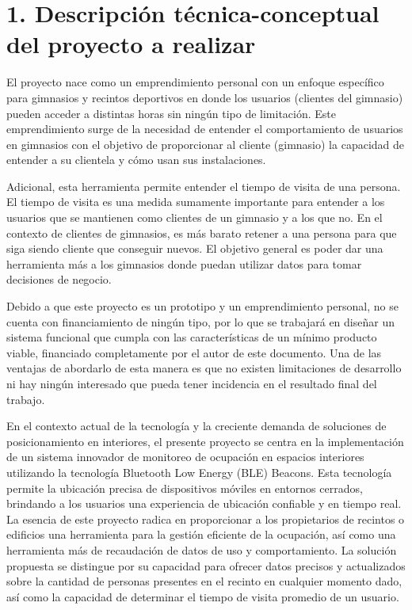 \documentclass[
11pt, %
]{charter}
\begin{document}
\section{1. Descripción técnica-conceptual del proyecto a realizar}
\label{sec:descripcion}

\setlength{\parindent}{1cm}El proyecto nace como un emprendimiento personal con un enfoque específico para gimnasios y recintos deportivos en donde los usuarios (clientes del gimnasio) pueden acceder a distintas horas sin ningún tipo de limitación. Este emprendimiento surge de la necesidad de entender el comportamiento de usuarios en gimnasios con el objetivo de proporcionar al cliente (gimnasio) la capacidad de entender a su clientela y cómo usan sus instalaciones. 

\setlength{\parindent}{1cm}Adicional, esta herramienta permite entender el tiempo de visita de una persona. El tiempo de visita es una medida sumamente importante para entender a los usuarios que se mantienen como clientes de un gimnasio y a los que no. En el contexto de clientes de gimnasios, es más barato retener a una persona para que siga siendo cliente que conseguir nuevos. El objetivo general es poder dar una herramienta más a los gimnasios donde puedan utilizar datos para tomar decisiones de negocio.

\setlength{\parindent}{1cm}Debido a que este proyecto es un prototipo y un emprendimiento personal, no se cuenta con financiamiento de ningún tipo, por lo que se trabajará en diseñar un sistema funcional que cumpla con las características de un mínimo producto viable, financiado completamente por el autor de este documento. Una de las ventajas de abordarlo de esta manera es que no existen limitaciones de desarrollo ni hay ningún interesado que pueda tener incidencia en el resultado final del trabajo.

\setlength{\parindent}{1cm}En el contexto actual de la tecnología y la creciente demanda de soluciones de posicionamiento en interiores, el presente proyecto se centra en la implementación de un sistema innovador de monitoreo de ocupación en espacios interiores utilizando la tecnología Bluetooth Low Energy (BLE) Beacons. Esta tecnología permite la ubicación precisa de dispositivos móviles en entornos cerrados, brindando a los usuarios una experiencia de ubicación confiable y en tiempo real. La esencia de este proyecto radica en proporcionar a los propietarios de recintos o edificios una herramienta para la gestión eficiente de la ocupación, así como una herramienta más de recaudación de datos de uso y comportamiento. La solución propuesta se distingue por su capacidad para ofrecer datos precisos y actualizados sobre la cantidad de personas presentes en el recinto en cualquier momento dado, así como la capacidad de determinar el tiempo de visita promedio de un usuario.
\end{document}
